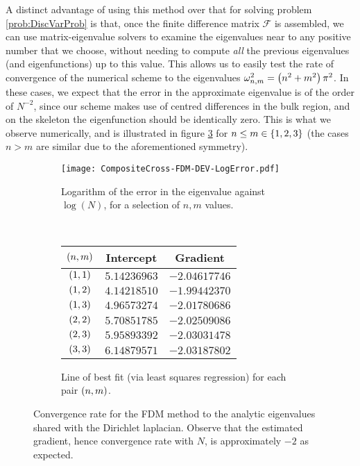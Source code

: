 A distinct advantage of using this method over that for solving problem \ref{prob:DiscVarProb} is that, once the finite difference matrix $\mathcal{F}$ is assembled, we can use matrix-eigenvalue solvers to examine the eigenvalues near to any positive number that we choose, without needing to compute \emph{all} the previous eigenvalues (and eigenfunctions) up to this value.
This allows us to easily test the rate of convergence of the numerical scheme to the eigenvalues $\omega_{n,m}^2 = \left( n^2+m^2 \right)\pi^2$.
In these cases, we expect that the error in the approximate eigenvalue is of the order of $N^{-2}$, since our scheme makes use of centred differences in the bulk region, and on the skeleton the eigenfunction should be identically zero.
This is what we observe numerically, and is illustrated in figure \ref{fig:CompositeCross-FDM-DEV} for $n\leq m\in\left\{ 1,2,3 \right\}$ (the cases $n>m$ are similar due to the aforementioned symmetry).
\begin{figure}[t!]
	\centering
	\begin{subfigure}[t]{0.45\textwidth}
		\centering
		\texttt{[image: CompositeCross-FDM-DEV-LogError.pdf]}
		\caption[]{\label{fig:CompositeCross-FDM-DEV-LogError} Logarithm of the error in the eigenvalue against $\log(N)$, for a selection of $n,m$ values.}
	\end{subfigure}
	~
	\begin{subfigure}[t]{0.45\textwidth}
		\centering
		\begin{tabular}[b]{| c | c | c |}
			\hline
			$\left( n,m \right)$ & Intercept & Gradient \\
			\hline
			$\left( 1, 1 \right)$ & $5.14236963$ & $-2.04617746$ \\
			\hline
			$\left( 1, 2 \right)$ & $4.14218510$ & $-1.99442370$ \\
			\hline
			$\left( 1, 3 \right)$ & $4.96573274$ & $-2.01780686$ \\
			\hline
			$\left( 2, 2 \right)$ & $5.70851785$ & $-2.02509086$ \\
			\hline
			$\left( 2, 3 \right)$ & $5.95893392$ & $-2.03031478$ \\
			\hline
			$\left( 3, 3 \right)$ & $6.14879571$ & $-2.03187802$ \\
			\hline
		\end{tabular}
		\caption[]{\label{fig:CompositeCross-FDM-DEV-LoBF} Line of best fit (via least squares regression) for each pair $\left( n,m \right)$.}
	\end{subfigure}
	\caption[Error in the eigenvalue approximation as a function of mesh size, for the cross-in-the-plane geometry.]{\label{fig:CompositeCross-FDM-DEV} Convergence rate for the FDM method to the analytic eigenvalues shared with the Dirichlet laplacian. Observe that the estimated gradient, hence convergence rate with $N$, is approximately $-2$ as expected.}
\end{figure}
